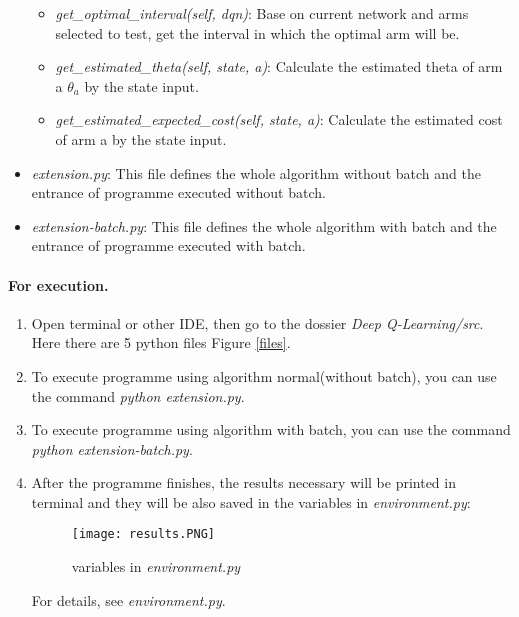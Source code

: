 \documentclass[a4paper,10pt]{article}
\begin{document}
\begin{itemize}
\begin{itemize}
\item \textit{get\_optimal\_interval(self, dqn)}: Base on current network and arms selected to test, get the interval in which the optimal arm will be.

\item \textit{get\_estimated\_theta(self, state, a)}: Calculate the estimated theta of arm a $\theta_a$ by the state input.

\item \textit{get\_estimated\_expected\_cost(self, state, a)}: Calculate the estimated cost of arm a by the state input.

\end{itemize}


\item \textit{extension.py}: This file defines the whole algorithm without batch and the entrance of programme executed without batch.

\item \textit{extension-batch.py}: This file defines the whole algorithm with batch and the entrance of programme executed with batch.
\end{itemize}

\paragraph{For execution.}
\begin{enumerate}
\item Open terminal or other IDE, then go to the dossier \textit{Deep Q-Learning/src}. Here there are 5 python files Figure \ref{files}.

\item To execute programme using algorithm normal(without batch), you can use the command \textit{python extension.py}.




\item To execute programme using algorithm with batch, you can use the command \textit{python extension-batch.py}.

\item After the programme finishes, the results necessary will be printed in terminal and they will be also saved in the variables in \textit{environment.py}:
\begin{figure}[h]
    \center
    \texttt{[image: results.PNG]}
	\caption{variables in \textit{environment.py}}
	\label{results}
\end{figure}

For details, see \textit{environment.py}.

\end{enumerate}
\end{document}
